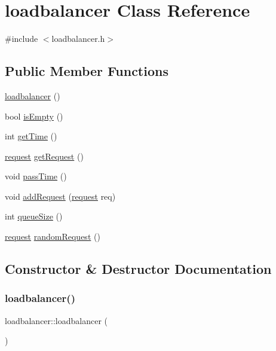 \hypertarget{classloadbalancer}{}\section{loadbalancer Class Reference}
\label{classloadbalancer}


{\ttfamily \#include $<$loadbalancer.\+h$>$}

\subsection*{Public Member Functions}
\begin{DoxyCompactItemize}
\item 
\hyperlink{classloadbalancer_ad453fd2fc0c910f82ef31c18353fc774}{loadbalancer} ()
\item 
bool \hyperlink{classloadbalancer_a542b0b5b5759c074e3e8d1cbf1f33b52}{is\+Empty} ()
\item 
int \hyperlink{classloadbalancer_afc308893c7ab0fc8b92036deae7a2de9}{get\+Time} ()
\item 
\hyperlink{structrequest}{request} \hyperlink{classloadbalancer_a3d1715e4b2218a7aa9ad74e3e4fa6167}{get\+Request} ()
\item 
void \hyperlink{classloadbalancer_a4d793bdf97c72b577ada58a774c3bddb}{pass\+Time} ()
\item 
void \hyperlink{classloadbalancer_a2c45d009dffc50f5d5d3a6c2b295311d}{add\+Request} (\hyperlink{structrequest}{request} req)
\item 
int \hyperlink{classloadbalancer_a9716bb001708f3c7792df0d1c8689ab0}{queue\+Size} ()
\item 
\hyperlink{structrequest}{request} \hyperlink{classloadbalancer_abaa9c95170cbf3c1c3041b17d31df4c0}{random\+Request} ()
\end{DoxyCompactItemize}


\subsection{Constructor \& Destructor Documentation}
\mbox{\label{classloadbalancer_ad453fd2fc0c910f82ef31c18353fc774}} 
\subsubsection{\texorpdfstring{loadbalancer()}{loadbalancer()}}
{\footnotesize\ttfamily loadbalancer\+::loadbalancer (\begin{DoxyParamCaption}{ }\end{DoxyParamCaption})}

